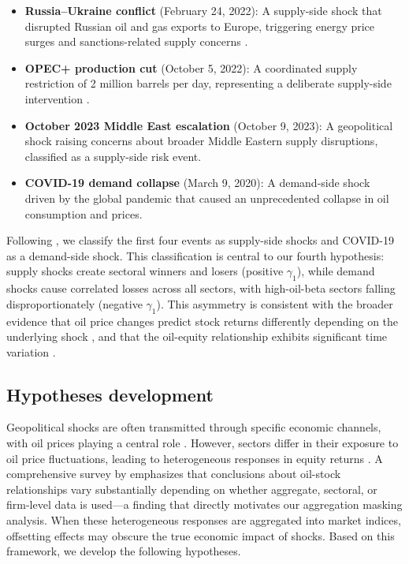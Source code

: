 \documentclass[12pt,preprint,authoryear]{elsarticle}
\begin{document}
\begin{itemize}
    \item \textbf{Russia--Ukraine conflict} (February 24, 2022): A supply-side shock that disrupted Russian oil and gas exports to Europe, triggering energy price surges and sanctions-related supply concerns \citep{boungou2022ukraine,yang2023spillovers}.
    \item \textbf{OPEC+ production cut} (October 5, 2022): A coordinated supply restriction of 2 million barrels per day, representing a deliberate supply-side intervention \citep{kanzig2021macroeconomic}.
    \item \textbf{October 2023 Middle East escalation} (October 9, 2023): A geopolitical shock raising concerns about broader Middle Eastern supply disruptions, classified as a supply-side risk event.
    \item \textbf{COVID-19 demand collapse} (March 9, 2020): A demand-side shock driven by the global pandemic that caused an unprecedented collapse in oil consumption and prices.
\end{itemize}

Following \citet{kilian2009not}, we classify the first four events as supply-side shocks and COVID-19 as a demand-side shock. This classification is central to our fourth hypothesis: supply shocks create sectoral winners and losers (positive $\gamma_1$), while demand shocks cause correlated losses across all sectors, with high-oil-beta sectors falling disproportionately (negative $\gamma_1$). This asymmetry is consistent with the broader evidence that oil price changes predict stock returns differently depending on the underlying shock \citep{driesprong2008striking,narayan2015role,kilian2009impact,ready2018oil}, and that the oil-equity relationship exhibits significant time variation \citep{catik2020oil,salisu2017revisiting,maghyereh2016directional}.

\subsection{Hypotheses development}
Geopolitical shocks are often transmitted through specific economic channels, with oil prices playing a central role \citep{chen1986economic,hamilton2003oil,kilian2009not,kanzig2021macroeconomic,baumeister2019structural}. However, sectors differ in their exposure to oil price fluctuations, leading to heterogeneous responses in equity returns \citep{jones1996oil,huang1996energy,sadorsky1999oil,lee2002dynamic,arouri2012oil,elyasiani2011oil,scholtens2012oil}. A comprehensive survey by \citet{degiannakis2018review} emphasizes that conclusions about oil-stock relationships vary substantially depending on whether aggregate, sectoral, or firm-level data is used---a finding that directly motivates our aggregation masking analysis. When these heterogeneous responses are aggregated into market indices, offsetting effects may obscure the true economic impact of shocks. Based on this framework, we develop the following hypotheses.
\end{document}
